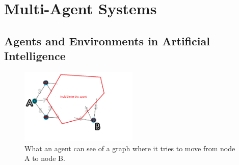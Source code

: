 
\section{Multi-Agent Systems}


\subsection{Agents and Environments in Artificial Intelligence}

\begin{figure}
\begin{centering}
\includegraphics[width=0.5\textwidth,bb = 0 0 200 100, draft, type=eps]{MASNodeSearch.png}
\par\end{centering}

\caption{What an agent can see of a graph where it tries to move from node
A to node B.\label{fig:MASNodeSearch}}


\end{figure}


